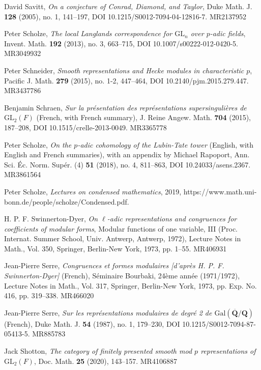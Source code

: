 \item[{[Sav05]}] David Savitt, \emph{On a conjecture of Conrad, Diamond, and Taylor}, Duke Math. J. \textbf{128} (2005), no. 1, 141--197, DOI 10.1215/S0012-7094-04-12816-7. MR2137952
\item[{[Sch13]}] Peter Scholze, \emph{The local Langlands correspondence for $\mathrm{GL}_n$ over $p$-adic fields}, Invent. Math. \textbf{192} (2013), no. 3, 663--715, DOI 10.1007/s00222-012-0420-5. MR3049932
\item[{[Sch15a]}] Peter Schneider, \emph{Smooth representations and Hecke modules in characteristic $p$}, Pacific J. Math. \textbf{279} (2015), no. 1-2, 447--464, DOI 10.2140/pjm.2015.279.447. MR3437786
\item[{[Sch15b]}] Benjamin Schraen, \emph{Sur la pr\'esentation des repr\'esentations supersinguli\`eres de $\mathrm{GL}_2(F)$} (French, with French summary), J. Reine Angew. Math. \textbf{704} (2015), 187--208, DOI 10.1515/crelle-2013-0049. MR3365778
\item[{[Sch18]}] Peter Scholze, \emph{On the $p$-adic cohomology of the Lubin-Tate tower} (English, with English and French summaries), with an appendix by Michael Rapoport, Ann. Sci. \'Ec. Norm. Sup\'er. (4) \textbf{51} (2018), no. 4, 811--863, DOI 10.24033/asens.2367. MR3861564
\item[{[Sch19]}] Peter Scholze, \emph{Lectures on condensed mathematics}, 2019, https://www.math.uni-bonn.de/people/scholze/Condensed.pdf.
\item[{[SD73]}] H. P. F. Swinnerton-Dyer, \emph{On $\ell$-adic representations and congruences for coefficients of modular forms}, Modular functions of one variable, III (Proc. Internat. Summer School, Univ. Antwerp, Antwerp, 1972), Lecture Notes in Math., Vol. 350, Springer, Berlin-New York, 1973, pp. 1--55. MR406931
\item[{[Ser73]}] Jean-Pierre Serre, \emph{Congruences et formes modulaires [d'apr\`es H. P. F. Swinnerton-Dyer]} (French), S\'eminaire Bourbaki, 24\`eme ann\'ee (1971/1972), Lecture Notes in Math., Vol. 317, Springer, Berlin-New York, 1973, pp. Exp. No. 416, pp. 319--338. MR466020
\item[{[Ser87]}] Jean-Pierre Serre, \emph{Sur les repr\'esentations modulaires de degr\'e 2 de $\mathrm{Gal}(\overline{\mathbf{Q}}/\mathbf{Q})$} (French), Duke Math. J. \textbf{54} (1987), no. 1, 179--230, DOI 10.1215/S0012-7094-87-05413-5. MR885783
\item[{[Sho20]}] Jack Shotton, \emph{The category of finitely presented smooth mod $p$ representations of $\mathrm{GL}_2(F)$}, Doc. Math. \textbf{25} (2020), 143--157. MR4106887

